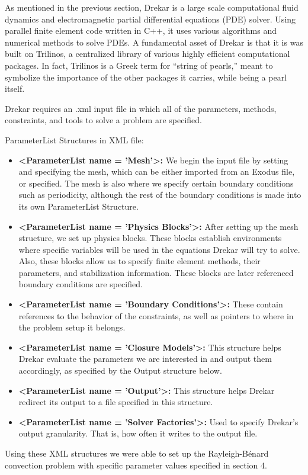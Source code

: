 As mentioned in the previous section, Drekar is a large scale computational fluid dynamics and electromagnetic partial differential equations (PDE) solver. Using parallel finite element code written in C++, it uses various algorithms and numerical methods to solve PDEs. A fundamental asset of Drekar is that it is was built on Trilinos, a centralized library of various highly efficient computational packages. In fact, Trilinos is a Greek term for “string of pearls,” meant to symbolize the importance of the other packages it carries, while being a pearl itself. 

Drekar requires an .xml input file in which all of the parameters, methods, constraints, and tools to solve a problem are specified. 

ParameterList Structures in XML file: 

\begin{itemize}
    \item[] \textbf{<ParameterList name = 'Mesh'>:} We begin the input file by setting and specifying the mesh, which can be either imported from an Exodus file, or specified. The mesh is also where we specify certain boundary conditions such as periodicity, although the rest of the boundary conditions is made into its own ParameterList Structure. 
    \item[] \textbf{<ParameterList name = 'Physics Blocks'>:} After setting up the mesh structure, we set up physics blocks. These blocks establish environments where specific variables will be used in the equations Drekar will try to solve. Also, these blocks allow us to specify finite element methods, their parameters, and stabilization information. These blocks are later referenced boundary conditions are specified.
    \item[] \textbf{<ParameterList name = 'Boundary Conditions'>:} These contain references to the behavior of the constraints, as well as pointers to where in the problem setup it belongs. 
    \item[] \textbf{<ParameterList name = 'Closure Models'>:} This structure helps Drekar evaluate the parameters we are interested in and output them accordingly, as specified by the Output structure below.
    \item[] \textbf{<ParameterList name = 'Output'>:} This structure helps Drekar redirect its output to a file specified in this structure.
    \item[] \textbf{<ParameterList name = 'Solver Factories'>:} Used to specify Drekar's output granularity. That is, how often it writes to the output file.  
\end{itemize}
 
 Using these XML structures we were able to set up the Rayleigh-Bénard convection problem with specific parameter values specified in section 4.